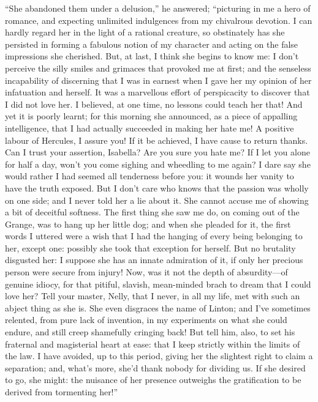 \par “She abandoned them under a delusion,” he answered; “picturing in me a hero of romance, and expecting unlimited indulgences from my chivalrous devotion. I can hardly regard her in the light of a rational creature, so obstinately has she persisted in forming a fabulous notion of my character and acting on the false impressions she cherished. But, at last, I think she begins to know me: I don't perceive the silly smiles and grimaces that provoked me at first; and the senseless incapability of discerning that I was in earnest when I gave her my opinion of her infatuation and herself. It was a marvellous effort of perspicacity to discover that I did not love her. I believed, at one time, no lessons could teach her that! And yet it is poorly learnt; for this morning she announced, as a piece of appalling intelligence, that I had actually succeeded in making her hate me! A positive labour of Hercules, I assure you! If it be achieved, I have cause to return thanks. Can I trust your assertion, Isabella? Are you sure you hate me? If I let you alone for half a day, won't you come sighing and wheedling to me again? I dare say she would rather I had seemed all tenderness before you: it wounds her vanity to have the truth exposed. But I don't care who knows that the passion was wholly on one side; and I never told her a lie about it. She cannot accuse me of showing a bit of deceitful softness. The first thing she saw me do, on coming out of the Grange, was to hang up her little dog; and when she pleaded for it, the first words I uttered were a wish that I had the hanging of every being belonging to her, except one: possibly she took that exception for herself. But no brutality disgusted her: I suppose she has an innate admiration of it, if only her precious person were secure from injury! Now, was it not the depth of absurdity—of genuine idiocy, for that pitiful, slavish, mean-minded brach to dream that I could love her? Tell your master, Nelly, that I never, in all my life, met with such an abject thing as she is. She even disgraces the name of Linton; and I've sometimes relented, from pure lack of invention, in my experiments on what she could endure, and still creep shamefully cringing back! But tell him, also, to set his fraternal and magisterial heart at ease: that I keep strictly within the limits of the law. I have avoided, up to this period, giving her the slightest right to claim a separation; and, what's more, she'd thank nobody for dividing us. If she desired to go, she might: the nuisance of her presence outweighs the gratification to be derived from tormenting her!”
